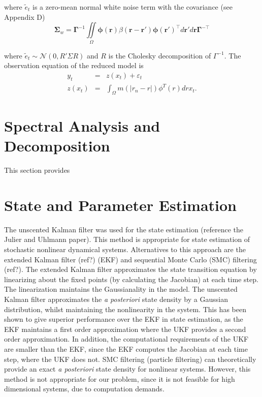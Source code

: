 \documentclass[onecolumn,draftcls]{IEEEtran}
\begin{document}
\begin{todo}{where $\tilde{e}_t$ is a zero-mean normal white noise term with the covariance (see Appendix D)
\begin{equation} 
\mathbf \Sigma_w={}\mathbf{\Gamma}^{-1}\iint\limits_{\Omega}\boldsymbol\phi\left(\mathbf r\right) \beta\left(\mathbf r- \mathbf r' \right)\boldsymbol\phi\left(\mathbf r'\right)^{\top}d\mathbf r' d\mathbf r\mathbf{\Gamma}^{- \top} 
\end{equation}}
 
\end{todo}

where $\tilde{e}_t \sim \mathcal{N}\left(0,R' \Sigma R\right)$ and $R$ is the Cholesky decomposition of $\Gamma^{-1}$. The observation equation of the reduced model is
\begin{eqnarray}\label{ObservationEquation}
    y_t &=& z\left(x_t\right) + \varepsilon_t \\
	z\left(x_t\right) &=& \int_\Omega m\left(|r_n-r|\right)\phi^T\left(r\right) dr x_t.
\end{eqnarray}

\section{Spectral Analysis and Decomposition}
This section provides


\section{State and Parameter Estimation}
The unscented Kalman filter was used for the state estimation (reference the Julier and Uhlmann paper). This method is appropriate for state estimation of stochastic nonlinear dynamical systems. Alternatives to this approach are the extended Kalman filter (ref?) (EKF) and sequential Monte Carlo (SMC) filtering (ref?). The extended Kalman filter approximates the state transition equation by linearizing about the fixed points (by calculating the Jacobian) at each time step. The linearization maintains the Gaussianality in the model. The unscented Kalman filter approximates the \emph{a posteriori} state density by a Gaussian distribution, whilst maintaining the nonlinearity in the system. This has been shown to give superior performance over the EKF in state estimation, as the EKF maintains a first order approximation where the UKF provides a second order approximation. In addition, the computational requirements of the UKF are smaller than the EKF, since the EKF computes the Jacobian at each time step, where the UKF does not. SMC filtering (particle filtering) can theoretically provide an exact \emph{a posteriori} state density for nonlinear systems. However, this method is not appropriate for our problem, since it is not feasible for high dimensional systems, due to computation demands.
\end{document}
